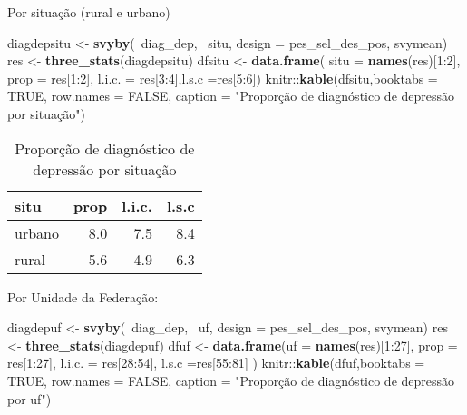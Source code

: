\documentclass[]{book}
\newenvironment{Shaded}{\begin{snugshade}}{\end{snugshade}}
\newcommand{\KeywordTok}[1]{\textcolor[rgb]{0.13,0.29,0.53}{\textbf{{#1}}}}
\newcommand{\DataTypeTok}[1]{\textcolor[rgb]{0.13,0.29,0.53}{{#1}}}
\newcommand{\DecValTok}[1]{\textcolor[rgb]{0.00,0.00,0.81}{{#1}}}
\newcommand{\StringTok}[1]{\textcolor[rgb]{0.31,0.60,0.02}{{#1}}}
\newcommand{\OtherTok}[1]{\textcolor[rgb]{0.56,0.35,0.01}{{#1}}}
\newcommand{\NormalTok}[1]{{#1}}
\theoremstyle{definition}
\theoremstyle{definition}
\theoremstyle{remark}
\begin{document}
Por situação (rural e urbano)

\begin{Shaded}
\begin{Highlighting}[]
\NormalTok{diagdepsitu <-}\StringTok{ }\KeywordTok{svyby}\NormalTok{(~diag_dep, ~situ, }\DataTypeTok{design =} \NormalTok{pes_sel_des_pos, }
  \NormalTok{svymean)}
\NormalTok{res <-}\StringTok{ }\KeywordTok{three_stats}\NormalTok{(diagdepsitu)}
\NormalTok{dfsitu <-}\StringTok{ }\KeywordTok{data.frame}\NormalTok{( }\DataTypeTok{situ =} \KeywordTok{names}\NormalTok{(res)[}\DecValTok{1}\NormalTok{:}\DecValTok{2}\NormalTok{], }\DataTypeTok{prop =} \NormalTok{res[}\DecValTok{1}\NormalTok{:}\DecValTok{2}\NormalTok{], }\DataTypeTok{l.i.c. =} \NormalTok{res[}\DecValTok{3}\NormalTok{:}\DecValTok{4}\NormalTok{],}\DataTypeTok{l.s.c =}\NormalTok{res[}\DecValTok{5}\NormalTok{:}\DecValTok{6}\NormalTok{])}
\NormalTok{knitr::}\KeywordTok{kable}\NormalTok{(dfsitu,}\DataTypeTok{booktabs =} \OtherTok{TRUE}\NormalTok{, }\DataTypeTok{row.names =} \OtherTok{FALSE}\NormalTok{, }
\DataTypeTok{caption =} \StringTok{"Proporção de diagnóstico de depressão por situação"}\NormalTok{)}
\end{Highlighting}
\end{Shaded}

\begin{table}

\caption{\label{tab:unnamed-chunk-52}Proporção de diagnóstico de depressão por situação}
\centering
\begin{tabular}[t]{lrrr}
\toprule
situ & prop & l.i.c. & l.s.c\\
\midrule
urbano & 8.0 & 7.5 & 8.4\\
rural & 5.6 & 4.9 & 6.3\\
\bottomrule
\end{tabular}
\end{table}

Por Unidade da Federação:

\begin{Shaded}
\begin{Highlighting}[]
\NormalTok{diagdepuf <-}\StringTok{ }\KeywordTok{svyby}\NormalTok{(~diag_dep, ~uf, }\DataTypeTok{design =} \NormalTok{pes_sel_des_pos, svymean)}
\NormalTok{res <-}\StringTok{ }\KeywordTok{three_stats}\NormalTok{(diagdepuf)}
\NormalTok{dfuf <-}\StringTok{ }\KeywordTok{data.frame}\NormalTok{(}\DataTypeTok{uf =} \KeywordTok{names}\NormalTok{(res)[}\DecValTok{1}\NormalTok{:}\DecValTok{27}\NormalTok{], }\DataTypeTok{prop =} \NormalTok{res[}\DecValTok{1}\NormalTok{:}\DecValTok{27}\NormalTok{], }
  \DataTypeTok{l.i.c. =} \NormalTok{res[}\DecValTok{28}\NormalTok{:}\DecValTok{54}\NormalTok{], }\DataTypeTok{l.s.c =}\NormalTok{res[}\DecValTok{55}\NormalTok{:}\DecValTok{81}\NormalTok{]  )}
\NormalTok{knitr::}\KeywordTok{kable}\NormalTok{(dfuf,}\DataTypeTok{booktabs =} \OtherTok{TRUE}\NormalTok{, }\DataTypeTok{row.names =} \OtherTok{FALSE}\NormalTok{, }
\DataTypeTok{caption =} \StringTok{"Proporção de diagnóstico de depressão por uf"}\NormalTok{)}
\end{Highlighting}
\end{Shaded}
\end{document}
